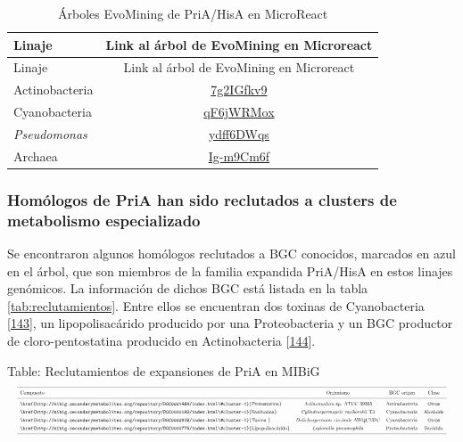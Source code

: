 \documentclass[12pt,twoside]{reedthesis}
\begin{document}
  \begin{longtable}[]{@{}lc@{}}
  \caption{Árboles EvoMining de PriA/HisA en MicroReact
  \label{tab:arboles}}\tabularnewline
  \toprule
  Linaje & Link al árbol de EvoMining en Microreact\tabularnewline
  \midrule
  \endfirsthead
  \toprule
  Linaje & Link al árbol de EvoMining en Microreact\tabularnewline
  \midrule
  \endhead
  Actinobacteria &
  \href{https://microreact.org/project/7g2IGfkv9}{7g2IGfkv9}\tabularnewline
  Cyanobacteria &
  \href{https://microreact.org/project/qF6jWRMox}{qF6jWRMox}\tabularnewline
  \emph{Pseudomonas} &
  \href{https://microreact.org/project/ydff6DWqs}{ydff6DWqs}\tabularnewline
  Archaea &
  \href{https://microreact.org/project/Ig-m9Cm6f}{Ig-m9Cm6f}\tabularnewline
  \bottomrule
  \end{longtable}
  
  \subsubsection{Homólogos de PriA han sido reclutados a clusters de
  metabolismo
  especializado}\label{homologos-de-pria-han-sido-reclutados-a-clusters-de-metabolismo-especializado}
  
  Se encontraron algunos homólogos reclutados a BGC conocidos, marcados en
  azul en el árbol, que son miembros de la familia expandida PriA/HisA en
  estos linajes genómicos. La información de dichos BGC está listada en la
  tabla \autoref{tab:reclutamientos}. Entre ellos se encuentran dos
  toxinas de Cyanobacteria
  {[}\protect\hyperlink{ref-moustafa_origin_2009}{143}{]}, un
  lipopolisacárido producido por una Proteobacteria y un BGC productor de
  cloro-pentostatina producido en Actinobacteria
  {[}\protect\hyperlink{ref-gao_biosynthesis_2017}{144}{]}.
  
  Table: Reclutamientos de expansiones de PriA en MIBiG
  \label{tab:reclutamientos}\\
  \[
  \resizebox{\columnwidth}{!}{%
  \begin{tabular}{ l c c c}
  \hline \\ [-1.5ex]  
  Compuesto & Organismo & BGC origen & Clase \\ [1ex]  
  \hline \\ [-1.5ex]
  \href{http://mibig.secondarymetabolites.org/repository/BGC0001484/index.html\#cluster-1}{Pentostatina}&\textit{Actinomadura} sp. ATCC 39365&Actinobacteria& Otros     \\ [1ex]  
  \href{http://mibig.secondarymetabolites.org/repository/BGC0000188/index.html\#cluster-1}{Saxitoxina}&\textit{Cylindrospermopsis~raciborskii} T3&Cyanobacteria&Alcaloide \\ [1ex]  
  \href{http://mibig.secondarymetabolites.org/repository/BGC0000928/index.html\#cluster-1}{Toxina }&\textit{Dolichospermum~circinale} AWQC131C & Cyanobacteria & Otros    \\ [1ex]  
  \href{http://mibig.secondarymetabolites.org/repository/BGC0000775/index.html\#cluster-1}{Lipopolisacárido}  &\textit{Legionella~pneumophila}    & Proteobacteria & Sac\'arido    \\ [1ex]  
  \hline
  \end{tabular}}
  \] \normalsize
  
\end{document}
